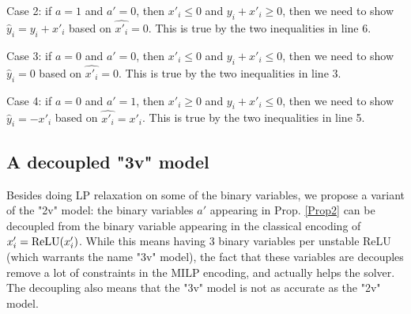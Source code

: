 Case 2: if $a = 1$ and $a' = 0$, then $x'_i \leq 0 $ and $y_i+x'_i\geq 0$, then we need to show $\hat{y}_i = y_i+x'_i$ based on  $\hat{x'_i} = 0$. This is true by the two inequalities in line 6.

Case 3: if $a = 0$ and $a' = 0$, then $x'_i \leq 0 $ and $y_i+x'_i\leq 0$, then we need to show $\hat{y}_i = 0$ based on  $\hat{x'_i} = 0$. This is true by the two inequalities in line 3.


Case 4: if $a = 0$ and $a' = 1$, then $x'_i \geq 0 $ and $y_i+x'_i\leq 0$, then we need to show $\hat{y}_i = -x'_i$ based on  $\hat{x'_i} = x'_i$. This is true by the two inequalities in line 5.

\fi


	
	
	

	
    
    
    


    \subsection{A decoupled "3v" model}

	Besides doing LP relaxation on some of the binary variables, we propose a 
    variant of the "2v" model: the binary variables $a'$ appearing in 
    Prop. \ref{Prop2} can be decoupled from the binary variable appearing in the classical encoding of $x'_i = \mathrm{ReLU}(x'_i)$. While this means having 3 binary variables per unstable ReLU (which warrants the name "3v" model), the fact that these variables are decouples remove a lot of constraints in the MILP encoding, and actually helps the solver. The decoupling also means that the "3v" model is not as accurate as the "2v" model.


